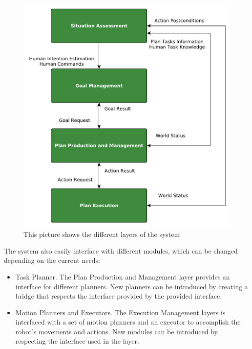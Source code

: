  \begin{figure}[h!]
	\centering
	\includegraphics[scale=0.45]{img/intro/system_architecture.pdf}
	\caption[System architecture]{This picture shows the different layers of the system}
	\label{fig:intro-system_architecture}
\end{figure}

The system also easily interface with different modules, which can be changed depending on the current needs:
\begin{itemize}
\item Task Planner. The Plan Production and Management layer provides an interface for different planners. New planners can be introduced by creating a bridge that respects the interface provided by the provided interface.
\item Motion Planners and Executors. The Execution Management layers is interfaced with a set of motion planners and an executor to accomplish the robot's movements and actions. New modules can be introduced by respecting the interface used in the layer.
\end{itemize}

